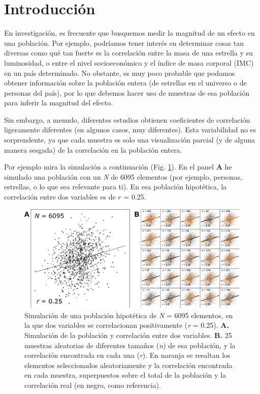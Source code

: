 \documentclass[
  bookmarksnumbered]{article}
\begin{document}
\hypertarget{introducciuxf3n}{%
\section{Introducción}\label{introducciuxf3n}}

En investigación, es frecuente que busquemos medir la magnitud de un efecto en una población. Por ejemplo, podríamos tener interés en determinar cosas tan diversas como qué tan fuerte es la correlación entre la masa de una estrella y su luminosidad, o entre el nivel socioeconómico y el índice de masa corporal (IMC) en un país determinado. No obstante, es muy poco probable que podamos obtener información sobre la población entera (de estrellas en el universo o de personas del país), por lo que debemos hacer uso de muestras de esa población para inferir la magnitud del efecto.

Sin embargo, a menudo, diferentes estudios obtienen coeficientes de correlación ligeramente diferentes (en algunos casos, muy diferentes). Esta variabilidad no es sorprendente, ya que cada muestra es solo una visualización parcial (y de alguna manera sesgada) de la correlación en la población entera.

Por ejemplo mira la simulación a continuación (Fig. \ref{fig:efecto}). En el panel \textbf{A} he simulado una población con un \emph{N} de 6095 elementos (por ejemplo, personas, estrellas, o lo que sea relevante para ti). En esa población hipotética, la correlación entre dos variables es de \(r\) = 0.25.

\begin{figure}
\centering
\includegraphics{images/sim_estabilidad.pdf}
\caption{\label{fig:efecto}Simulación de una población hipotética de \emph{N} = 6095 elementos, en la que dos variables se correlacionan positivamente (\emph{r} = 0.25). \textbf{A.} Simulación de la población y correlación entre dos variables. \textbf{B.} 25 muestras aleatorias de diferentes tamaños (\emph{n}) de esa población, y la correlación encontrada en cada una (\emph{r}). En naranja se resaltan los elementos seleccionados aleatoriamente y la correlación encontrada en cada muestra, superpuestos sobre el total de la población y la correlación real (en negro, como referencia).}
\end{figure}
\end{document}
